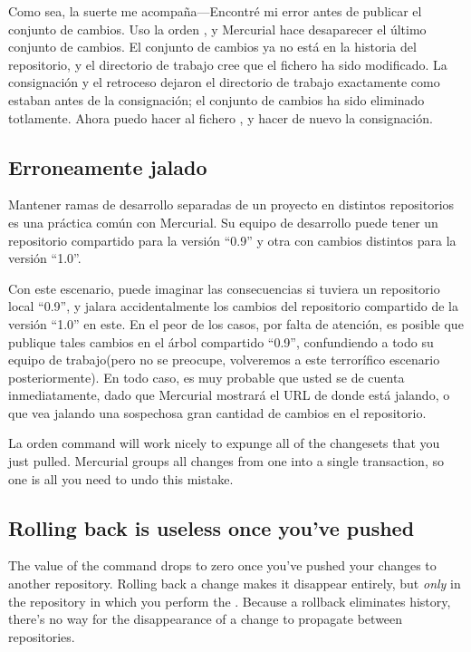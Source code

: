 Como sea, la suerte me acompaña---Encontré mi error antes de publicar
el conjunto de cambios.  Uso la orden , y Mercurial
hace desaparecer el último conjunto de cambios.
El conjunto de cambios ya no está en la historia del repositorio, y el
directorio de trabajo cree que el fichero  ha sido
modificado.  La consignación y el retroceso dejaron el directorio de
trabajo exactamente como estaban antes de la consignación; el conjunto
de cambios ha sido eliminado totlamente. Ahora puedo hacer 
al fichero , y hacer de nuevo la consignación.

\subsection{Erroneamente jalado}

Mantener ramas de desarrollo separadas de un proyecto en distintos
repositorios es una práctica común con Mercurial.  Su equipo de
desarrollo puede tener un repositorio compartido para la versión ``0.9''
y otra con cambios distintos para la versión ``1.0''.

Con este escenario, puede imaginar las consecuencias si tuviera un
repositorio local ``0.9'', y jalara accidentalmente los cambios del
repositorio compartido de la versión ``1.0'' en este.  En el peor de
los casos, por falta de atención, es posible que publique tales
cambios en el árbol compartido ``0.9'', confundiendo a todo su equipo
de trabajo(pero no se preocupe, volveremos a este terrorífico
escenario posteriormente).  En todo caso, es muy probable que usted se
de cuenta inmediatamente, dado que Mercurial mostrará el URL de donde
está jalando, o que vea jalando una sospechosa gran cantidad de
cambios en el repositorio.

La orden  command will work nicely to expunge all of the
changesets that you just pulled.  Mercurial groups all changes from
one  into a single transaction, so one  is
all you need to undo this mistake.

\subsection{Rolling back is useless once you've pushed}
\label{sec:undo:rollback-after-push}

The value of the  command drops to zero once you've
pushed your changes to another repository.  Rolling back a change
makes it disappear entirely, but \emph{only} in the repository in
which you perform the .  Because a rollback eliminates
history, there's no way for the disappearance of a change to propagate
between repositories.


